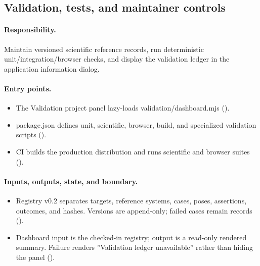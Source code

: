 \documentclass[11pt]{article}
\begin{document}
\begin{small}
\begin{itemize}[leftmargin=*]
\end{itemize}

\subsection{Validation, tests, and maintainer controls}\label{appB:sec21}

\paragraph{Responsibility.}

Maintain versioned scientific reference records, run deterministic unit/integration/browser checks, and display the validation ledger in the application information dialog.

\paragraph{Entry points.}

\begin{itemize}[leftmargin=*]

\item The Validation project panel lazy-loads validation/dashboard.mjs ().

\item package.json defines unit, scientific, browser, build, and specialized validation scripts ().

\item CI builds the production distribution and runs scientific and browser suites ().

\end{itemize}

\paragraph{Inputs, outputs, state, and boundary.}

\begin{itemize}[leftmargin=*]

\item Registry v0.2 separates targets, reference systems, cases, poses, assertions, outcomes, and hashes. Versions are append-only; failed cases remain records ().

\item Dashboard input is the checked-in registry; output is a read-only rendered summary. Failure renders ''Validation ledger unavailable'' rather than hiding the panel ().


\end{itemize}
\end{small}
\end{document}
